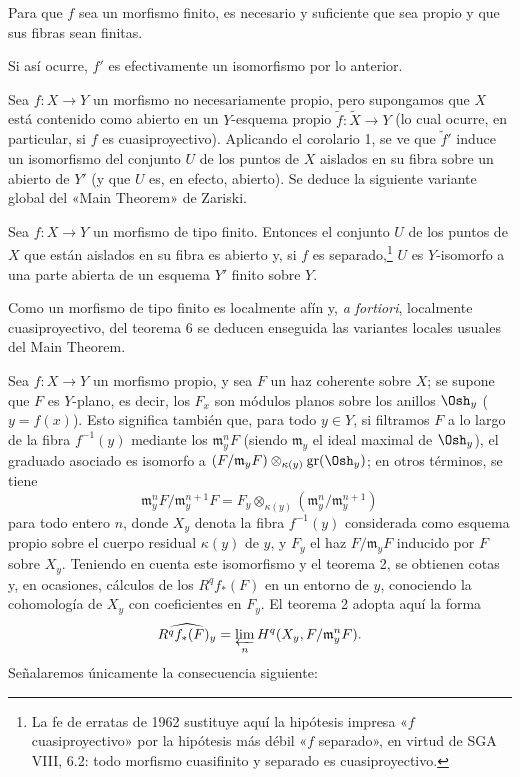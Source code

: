  Para que $f$ sea un morfismo finito, es necesario y
suficiente que sea propio y que sus fibras sean finitas.

Si así ocurre, $f'$ es efectivamente un isomorfismo por lo anterior.

Sea $f:X\longrightarrow Y$ un morfismo no necesariamente propio, pero
supongamos que $X$ está contenido como abierto en un $Y$-esquema propio
$\widetilde f:\widetilde X\longrightarrow Y$ (lo cual ocurre, en particular,
si $f$ es cuasiproyectivo). Aplicando el corolario 1, se ve que $\widetilde f'$
induce un isomorfismo del conjunto $U$ de los puntos de $X$ aislados en su fibra
sobre un abierto de $Y'$ (y que $U$ es, en efecto, abierto). Se deduce la
siguiente variante global del «Main Theorem» de Zariski.

 Sea
$f:X\longrightarrow Y$ un morfismo de tipo finito. Entonces el conjunto $U$ de
los puntos de $X$ que están aislados en su fibra es abierto y, si $f$ es
separado,\footnote{La fe de erratas de 1962 sustituye aquí la hipótesis impresa
«$f$ cuasiproyectivo» por la hipótesis más débil «$f$ separado», en virtud de
SGA VIII, 6.2: todo morfismo cuasifinito y separado es cuasiproyectivo.} $U$ es
$Y$-isomorfo a una parte abierta de un esquema $Y'$ finito sobre $Y$.

Como un morfismo de tipo finito es localmente afín y, \textit{a fortiori},
localmente cuasiproyectivo, del teorema 6 se deducen enseguida las variantes
locales usuales del Main Theorem.


Sea $f:X\longrightarrow Y$ un morfismo propio, y sea $F$ un haz coherente sobre
$X$; se supone que $F$ es $Y$-plano, es decir, los $F_x$ son módulos planos sobre los
anillos $\Osh_y$ ($y=f(x)$). Esto significa también que, para todo $y\in Y$, si
filtramos $F$ a lo largo de la fibra $f^{-1}(y)$ mediante los
$\mathfrak m_y^nF$ (siendo $\mathfrak m_y$ el ideal maximal de $\Osh_y$), el
graduado asociado es isomorfo a
$(F/\mathfrak m_yF)\otimes_{\kappa(y)}\operatorname{gr}(\Osh_y)$; en otros
términos, se tiene
\[
  \mathfrak m_y^nF/\mathfrak m_y^{n+1}F
  =F_y\otimes_{\kappa(y)}
  (\mathfrak m_y^n/\mathfrak m_y^{n+1})
\]
para todo entero $n$, donde $X_y$ denota la fibra $f^{-1}(y)$ considerada como
esquema propio sobre el cuerpo residual $\kappa(y)$ de $y$, y $F_y$ el haz
$F/\mathfrak m_yF$ inducido por $F$ sobre $X_y$. Teniendo en cuenta este
isomorfismo y el teorema 2, se obtienen cotas y, en ocasiones, cálculos de los
$R^qf_*(F)$ en un entorno de $y$, conociendo la cohomología de $X_y$ con
coeficientes en $F_y$. El teorema 2 adopta aquí la forma
\[
  \widehat{R^qf_*(F)_y}
  =\varprojlim_n H^q(X_y,F/\mathfrak m_y^nF).
\]
Señalaremos únicamente la consecuencia siguiente:

